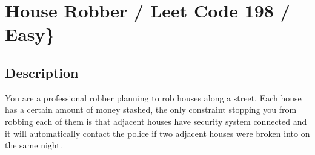 \documentclass[]{book}
\newenvironment{Shaded}{\begin{snugshade}}{\end{snugshade}}
\newcommand{\CommentTok}[1]{\textcolor[rgb]{0.56,0.35,0.01}{\textit{#1}}}
\newcommand{\DataTypeTok}[1]{\textcolor[rgb]{0.13,0.29,0.53}{#1}}
\newcommand{\DecValTok}[1]{\textcolor[rgb]{0.00,0.00,0.81}{#1}}
\newcommand{\FunctionTok}[1]{\textcolor[rgb]{0.00,0.00,0.00}{#1}}
\newcommand{\KeywordTok}[1]{\textcolor[rgb]{0.13,0.29,0.53}{\textbf{#1}}}
\newcommand{\NormalTok}[1]{#1}
\begin{document}
\begin{Shaded}
\end{Shaded}

\hypertarget{house-robber-leet-code-198-easy}{%
\section{House Robber / Leet Code 198 / Easy\}}\label{house-robber-leet-code-198-easy}}

\hypertarget{description-32}{%
\subsection{Description}\label{description-32}}

You are a professional robber planning to rob houses along a street. Each house has a certain amount of money stashed,
the only constraint stopping you from robbing each of them is that adjacent houses have security system connected and
it will automatically contact the police if two adjacent houses were broken into on the same night.
\end{document}
